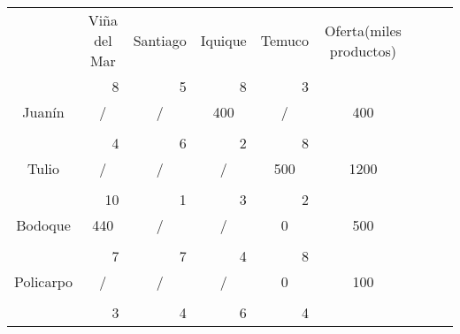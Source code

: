 \documentclass[12pt,letterpaper]{article}
\begin{document}
\begin{center}
\begin{tabular}{ccc|ccc|ccc|ccc|ccc|ccc|ccc}
\multicolumn{3}{c|}{} & \multicolumn{3}{c}{Viña del Mar} & \multicolumn{3}{c}{Santiago} & \multicolumn{3}{c}{Iquique} & \multicolumn{3}{c|}{Temuco} & \multicolumn{3}{c}{Oferta(miles productos)}\\
\cline{1-15}
\multicolumn{3}{c|}{} & \multicolumn{3}{r|}{8} & \multicolumn{3}{r|}{5} & \multicolumn{3}{r|}{8} & \multicolumn{3}{r|}{3} \\
\multicolumn{3}{c|}{Juanín} & \multicolumn{3}{c|}{/} & \multicolumn{3}{c|}{/} & \multicolumn{3}{c|}{400} & \multicolumn{3}{c|}{/}& \multicolumn{3}{c}{400}\\
\multicolumn{3}{c|}{} & \multicolumn{3}{c|}{} & \multicolumn{3}{c|}{} & \multicolumn{3}{c|}{} & \multicolumn{3}{c|}{}\\
\cline{1-15}
\multicolumn{3}{c|}{} & \multicolumn{3}{r|}{4} & \multicolumn{3}{r|}{6} & \multicolumn{3}{r|}{2} & \multicolumn{3}{r|}{8} \\
\multicolumn{3}{c|}{Tulio} & \multicolumn{3}{c|}{/} & \multicolumn{3}{c|}{/} & \multicolumn{3}{c|}{/} & \multicolumn{3}{c|}{500}& \multicolumn{3}{c}{1200}\\
\multicolumn{3}{c|}{} & \multicolumn{3}{c|}{} & \multicolumn{3}{c|}{} & \multicolumn{3}{c|}{} & \multicolumn{3}{c|}{}\\
\cline{1-15}
\multicolumn{3}{c|}{} & \multicolumn{3}{r|}{10} & \multicolumn{3}{r|}{1} & \multicolumn{3}{r|}{3} & \multicolumn{3}{r|}{2} \\
\multicolumn{3}{c|}{Bodoque} & \multicolumn{3}{c|}{440} & \multicolumn{3}{c|}{/} & \multicolumn{3}{c|}{/} & \multicolumn{3}{c|}{0}& \multicolumn{3}{c}{500}\\
\multicolumn{3}{c|}{} & \multicolumn{3}{c|}{} & \multicolumn{3}{c|}{} & \multicolumn{3}{c|}{} & \multicolumn{3}{c|}{}\\
\cline{1-15}
\multicolumn{3}{c|}{} & \multicolumn{3}{r|}{7} & \multicolumn{3}{r|}{7} & \multicolumn{3}{r|}{4} & \multicolumn{3}{r|}{8} \\
\multicolumn{3}{c|}{Policarpo} & \multicolumn{3}{c|}{/} & \multicolumn{3}{c|}{/} & \multicolumn{3}{c|}{/} & \multicolumn{3}{c|}{0}& \multicolumn{3}{c}{100}\\
\multicolumn{3}{c|}{} & \multicolumn{3}{c|}{} & \multicolumn{3}{c|}{} & \multicolumn{3}{c|}{} & \multicolumn{3}{c|}{}\\
\cline{1-15}
\multicolumn{3}{c|}{} & \multicolumn{3}{r|}{3} & \multicolumn{3}{r|}{4} & \multicolumn{3}{r|}{6} & \multicolumn{3}{r|}{4} \\

\end{tabular}
\end{center}
\end{document}
